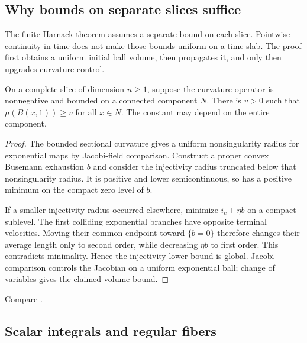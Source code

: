 \subsection{Why bounds on separate slices suffice}

The finite Harnack theorem assumes a separate bound on each slice.
Pointwise continuity in time does not make those bounds uniform on
a time slab. The proof first obtains a uniform initial ball volume,
then propagates it, and only then upgrades curvature control.

\begin{lemma}\label{lem:rf-initial-volume}
On a complete slice of dimension $n\geq1$, suppose the curvature
operator is nonnegative and bounded on a connected component $N$.
There is $v>0$ such that $\mu(B(x,1))\geq v$ for all $x\in N$.
The constant may depend on the entire component.
\end{lemma}
\begin{proof}
The bounded sectional curvature gives a uniform nonsingularity
radius for exponential maps by Jacobi-field comparison.
Construct a proper convex Busemann exhaustion $b$ and consider
the injectivity radius truncated below that nonsingularity radius.
It is positive and lower semicontinuous, so has a positive minimum
on the compact zero level of $b$.

If a smaller injectivity radius occurred elsewhere, minimize
$i_c+\eta b$ on a compact sublevel. The first colliding exponential
branches have opposite terminal velocities. Moving their common
endpoint toward $\{b=0\}$ therefore changes their average length
only to second order, while decreasing $\eta b$ to first order.
This contradicts minimality. Hence the injectivity lower bound is
global. Jacobi comparison controls the Jacobian on a uniform
exponential ball; change of variables gives the claimed volume bound.
\end{proof}
Compare \cite[Lemmas 3.8 and 3.13, pp.~15--19;
Lemma 5.1, pp.~35--37]{MaederBaumdickerSeidel2025}.

\subsection{Scalar integrals and regular fibers}
\label{sec:rf-scalar-integral}

